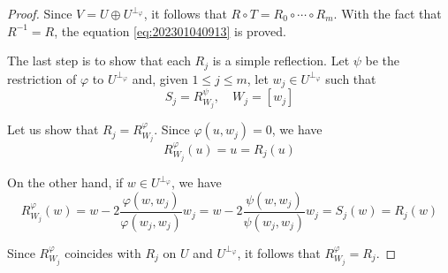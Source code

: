\begin{proof}
  Since $V = U \oplus U^{\perp_\varphi}$, it follows that $R \circ T = R_0 \circ \cdots \circ R_m$. With the fact that $R^{-1} = R$, the equation \ref{eq:202301040913} is proved.

  The last step is to show that each $R_j$ is a simple reflection. Let $\psi$ be the restriction of $\varphi$ to $U^{\perp_\varphi}$ and, given $1 \leq j \leq m$, let $w_j \in U^{\perp_\varphi}$ such that 
  \[
    S_j = R_{W_j}^\psi, \quad W_j = [w_j]
  \]

  Let us show that $R_j = R_{W_j}^\varphi$. Since $\varphi(u, w_j) = 0$, we have 
  \[
    R_{W_j}^\varphi(u) = u = R_j(u)
  \]

  On the other hand, if $w \in U^{\perp_\varphi}$, we have 
  \[
    R_{W_j}^\varphi(w) = w - 2 \frac{\varphi(w,w_j)}{\varphi(w_j, w_j)} w_j = w - 2 \frac{\psi(w,w_j)}{\psi(w_j, w_j)} w_j = S_j(w) = R_j(w)
  \]

  Since $R_{W_j}^\varphi$ coincides with $R_j$ on $U$ and $U^{\perp_\varphi}$, it follows that $R_{W_j}^\varphi = R_j$.
\end{proof}

